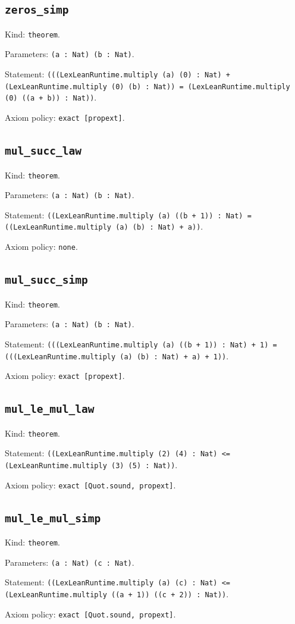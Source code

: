 \documentclass[11pt]{article}
\begin{document}
\subsection*{\texttt{zeros\_simp}}
\noindent Kind: \texttt{theorem}.\par
\noindent Parameters: \texttt{(a : Nat) (b : Nat)}.\par
\noindent Statement: \texttt{(((LexLeanRuntime.multiply (a) (0) : Nat) + (LexLeanRuntime.multiply (0) (b) : Nat)) = (LexLeanRuntime.multiply (0) ((a + b)) : Nat))}.\par
\noindent Axiom policy: \texttt{exact [propext]}.\par
\subsection*{\texttt{mul\_succ\_law}}
\noindent Kind: \texttt{theorem}.\par
\noindent Parameters: \texttt{(a : Nat) (b : Nat)}.\par
\noindent Statement: \texttt{((LexLeanRuntime.multiply (a) ((b + 1)) : Nat) = ((LexLeanRuntime.multiply (a) (b) : Nat) + a))}.\par
\noindent Axiom policy: \texttt{none}.\par
\subsection*{\texttt{mul\_succ\_simp}}
\noindent Kind: \texttt{theorem}.\par
\noindent Parameters: \texttt{(a : Nat) (b : Nat)}.\par
\noindent Statement: \texttt{(((LexLeanRuntime.multiply (a) ((b + 1)) : Nat) + 1) = (((LexLeanRuntime.multiply (a) (b) : Nat) + a) + 1))}.\par
\noindent Axiom policy: \texttt{exact [propext]}.\par
\subsection*{\texttt{mul\_le\_mul\_law}}
\noindent Kind: \texttt{theorem}.\par
\noindent Statement: \texttt{((LexLeanRuntime.multiply (2) (4) : Nat) <= (LexLeanRuntime.multiply (3) (5) : Nat))}.\par
\noindent Axiom policy: \texttt{exact [Quot.sound, propext]}.\par
\subsection*{\texttt{mul\_le\_mul\_simp}}
\noindent Kind: \texttt{theorem}.\par
\noindent Parameters: \texttt{(a : Nat) (c : Nat)}.\par
\noindent Statement: \texttt{((LexLeanRuntime.multiply (a) (c) : Nat) <= (LexLeanRuntime.multiply ((a + 1)) ((c + 2)) : Nat))}.\par
\noindent Axiom policy: \texttt{exact [Quot.sound, propext]}.\par
\end{document}
